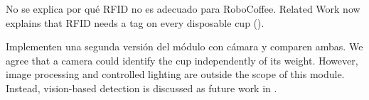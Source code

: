\documentclass{LabDSTresponse}
\begin{document}

{No se explica por qué RFID no es adecuado para RoboCoffee.}
{Related Work now explains that RFID needs a tag on every disposable cup
().}

{Implementen una segunda versión del módulo con cámara y comparen ambas.}
{We agree that a camera could identify the cup independently of its weight. However,
image processing and controlled lighting are outside the scope of this module. Instead,
vision-based detection is discussed as future work in .}
\end{document}
